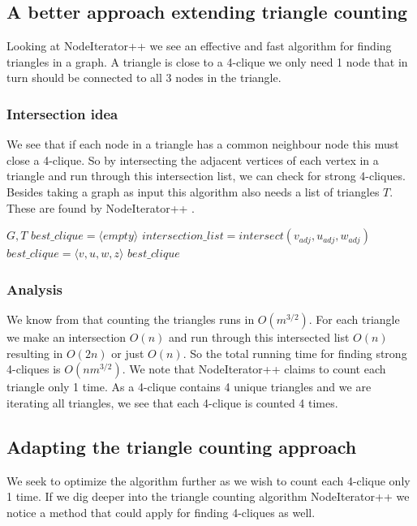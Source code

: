 \documentclass{article}
\begin{document}
\subsection{A better approach extending triangle counting}
Looking at NodeIterator++ \cite{countingTriangles} we see an effective and fast algorithm for finding triangles in a graph. A triangle is close to a 4-clique we only need 1 node that in turn should be connected to all 3 nodes in the triangle.

\subsubsection{Intersection idea}
We see that if each node in a triangle has a common neighbour node this must close a 4-clique. So by intersecting the adjacent vertices of each vertex in a triangle and run through this intersection list, we can check for strong 4-cliques. Besides taking a graph as input this algorithm also needs a list of triangles $T$. These are found by NodeIterator++ \cite{countingTriangles}.

\begin{algorithm}
\caption{$strong\_4clique\_finder+$}
\begin{algorithmic}
\REQUIRE $G,T$
\STATE $best\_clique = \langle empty\rangle $
	\STATE $intersection\_list = intersect(v_{adj}, u_{adj}, w_{adj})$
				\STATE $best\_clique = \langle v,u,w,z\rangle $
			\ENDIF
		\ENDFOR
	\ENDIF
\ENDFOR
\RETURN $best\_clique$
\end{algorithmic}
\end{algorithm}

\subsubsection{Analysis}
We know from \cite{countingTriangles} that counting the triangles runs in $O(m^{3/2})$. For each triangle we make an intersection $O(n)$ and run through this intersected list $O(n)$ resulting in $O(2n)$ or just $O(n)$. So the total running time for finding strong 4-cliques is $O(nm^{3/2})$. We note that NodeIterator++ claims to count each triangle only 1 time. As a 4-clique contains 4 unique triangles and we are iterating all triangles, we see that each 4-clique is counted 4 times.

\subsection{Adapting the triangle counting approach}
We seek to optimize the algorithm further as we wish to count each 4-clique only 1 time. If we dig deeper into the triangle counting algorithm NodeIterator++ \cite{countingTriangles} we notice a method that could apply for finding 4-cliques as well.
\end{document}
